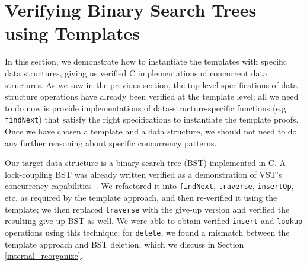 \documentclass[sigplan,screen]{acmart}
\begin{document}
\section{Verifying Binary Search Trees using Templates}
\label{BST_proof}
In this section, we demonstrate how to instantiate the templates with specific data structures, giving us verified C implementations of concurrent data structures. 
As we saw in the previous section, the top-level specifications of data structure operations have already been verified at the template level; all we need to do now is provide implementations of data-structure-specific functions (e.g. \lstinline{findNext}) that satisfy the right specifications to instantiate the template proofs. Once we have chosen a template and a data structure, we should not need to do any further reasoning about specific concurrency patterns.

Our target data structure is a binary search tree (BST) implemented in C. A lock-coupling BST was already written verified as a demonstration of VST's concurrency capabilities~\cite{bst-conc}. We refactored it into \lstinline{findNext}, \lstinline{traverse}, \lstinline{insertOp}, etc. as required by the template approach, and then re-verified it using the template; we then replaced \lstinline{traverse} with the give-up version and verified the resulting give-up BST as well. We were able to obtain verified \lstinline{insert} and \lstinline{lookup} operations using this technique; for \texttt{delete}, we found a mismatch between the template approach and BST deletion, which we discuss in Section \ref{internal_reorganize}.
\end{document}
